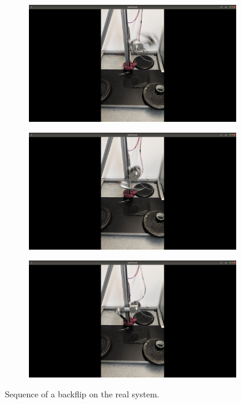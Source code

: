 \documentclass[onecolumn, letter paper]{report}
\begin{document}
\begin{figure}[htb!]
\begin{subfigure}{.16\textwidth}
    \end{subfigure}
    \begin{subfigure}{.16\textwidth}
    \includegraphics[width=\textwidth, trim={27cm 10cm 27cm 5cm}, clip]{figures/backflip/b4.png}
    \end{subfigure}
    \begin{subfigure}{.16\textwidth}
    \includegraphics[width=\textwidth, trim={27cm 10cm 27cm 5cm}, clip]{figures/backflip/b5.png}
    \end{subfigure}
    \begin{subfigure}{.16\textwidth}
    \includegraphics[width=\textwidth, trim={27cm 10cm 27cm 5cm}, clip]{figures/backflip/b6.png}
    \end{subfigure}
    \caption{Sequence of a backflip on the real system.}
    \label{fig:flip}
\end{figure}


\clearpage

\printbibliography[heading=bibintoc, title={Bibliography}]
\end{document}
